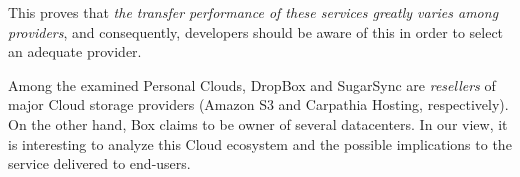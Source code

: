 This proves that \textit{the transfer performance of these services greatly varies among providers}, and
consequently, developers should be aware of this in order to select an adequate provider. 

Among the examined Personal Clouds, DropBox and SugarSync 
are \textit{resellers} of major Cloud storage providers (Amazon S3 
and Carpathia Hosting, respectively). On the other hand, Box claims to be owner of several
datacenters. In our view, it is interesting to analyze this 
Cloud ecosystem and the possible implications to the service delivered to end-users.

\begin{figure}[t]
 

\end{figure}
